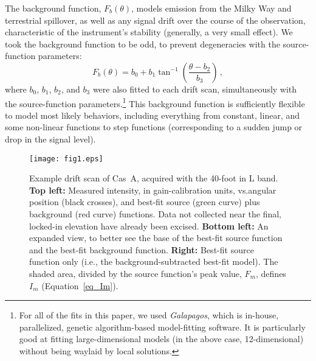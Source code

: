 \documentclass[fleqn,usenatbib]{mnras}
\begin{document}
The background function, $F_b(\theta)$, models emission from the Milky Way and terrestrial spillover, as well as any signal drift over the course of the observation, characteristic of the instrument's stability (generally, a very small effect).  We took the background function to be odd, to prevent degeneracies with the source-function parameters:
\begin{equation}\label{eq-background}
F_b(\theta) = b_0 + b_1\tan^{-1}\left(\frac{\theta-b_2}{b_3}\right) \, ,
\end{equation}
where $b_0$, $b_1$, $b_2$, and $b_3$ were also fitted to each drift scan, simultaneously with the source-function parameters.\footnote{For all of the fits in this paper, we used \textit{Galapagos}, which is in-house, parallelized, genetic algorithm-based model-fitting software.  It is particularly good at fitting large-dimensional models (in the above case, 12-dimensional) without being waylaid by local solutions.}  This background function is sufficiently flexible to model most likely behaviors, including everything from constant, linear, and some non-linear functions to step functions (corresponding to a sudden jump or drop in the signal level).

\begin{figure*}
 \begin{center}
 \texttt{[image: fig1.eps]}
 \caption{Example drift scan of Cas~A, acquired with the 40-foot in L band. \textbf{Top left:}  Measured intensity, in gain-calibration units, vs.\@ angular position (black crosses), and best-fit source (green curve) plus background (red curve) functions.  Data not collected near the final, locked-in elevation have already been excised.  \textbf{Bottom left:}  An expanded view, to better see the base of the best-fit source function and the best-fit background function.  \textbf{Right:}  Best-fit source function only (i.e., the background-subtracted best-fit model).  The shaded area, divided by the source function's peak value, $F_m$, defines $I_m$ (Equation~\ref{eq_Im}).}
 \label{fig_prof} 
 \end{center}
\end{figure*}
\end{document}
